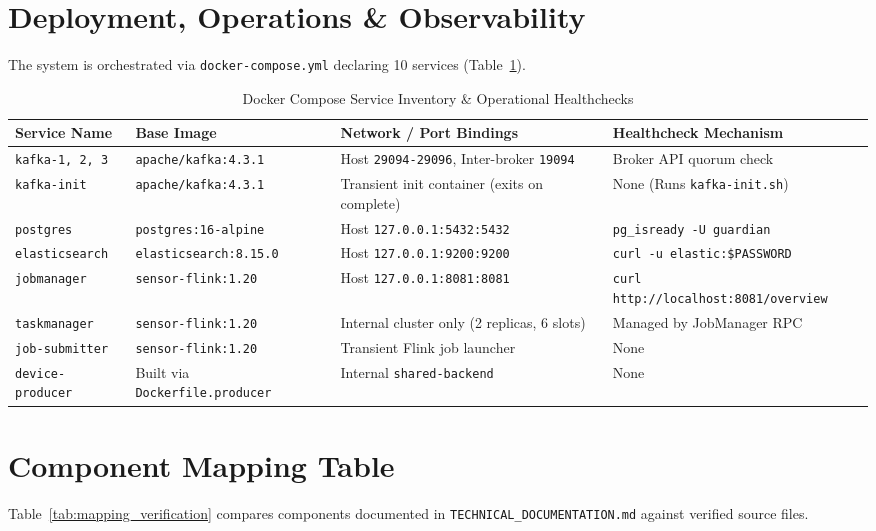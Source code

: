 \documentclass[10pt,a4paper]{report}
\begin{document}
\section{Deployment, Operations \& Observability}
The system is orchestrated via \texttt{docker-compose.yml} declaring 10 services (Table~\ref{tab:compose_inventory}).

\begin{table}[htbp]
\centering
\small
\caption{Docker Compose Service Inventory \& Operational Healthchecks}
\label{tab:compose_inventory}
\begin{tabularx}{\textwidth}{llXl}
\toprule
\textbf{Service Name} & \textbf{Base Image} & \textbf{Network / Port Bindings} & \textbf{Healthcheck Mechanism} \\
\midrule
\texttt{kafka-1, 2, 3} & \texttt{apache/kafka:4.3.1} & Host \texttt{29094-29096}, Inter-broker \texttt{19094} & Broker API quorum check \\
\texttt{kafka-init} & \texttt{apache/kafka:4.3.1} & Transient init container (exits on complete) & None (Runs \texttt{kafka-init.sh}) \\
\texttt{postgres} & \texttt{postgres:16-alpine} & Host \texttt{127.0.0.1:5432:5432} & \texttt{pg\_isready -U guardian} \\
\texttt{elasticsearch} & \texttt{elasticsearch:8.15.0} & Host \texttt{127.0.0.1:9200:9200} & \texttt{curl -u elastic:\$PASSWORD} \\
\texttt{jobmanager} & \texttt{sensor-flink:1.20} & Host \texttt{127.0.0.1:8081:8081} & \texttt{curl http://localhost:8081/overview} \\
\texttt{taskmanager} & \texttt{sensor-flink:1.20} & Internal cluster only (2 replicas, 6 slots) & Managed by JobManager RPC \\
\texttt{job-submitter} & \texttt{sensor-flink:1.20} & Transient Flink job launcher & None \\
\texttt{device-producer} & Built via \texttt{Dockerfile.producer} & Internal \texttt{shared-backend} & None \\
\bottomrule
\end{tabularx}
\end{table}

\section{Component Mapping Table}
Table~\ref{tab:mapping_verification} compares components documented in \texttt{TECHNICAL\_DOCUMENTATION.md} against verified source files.
\end{document}

